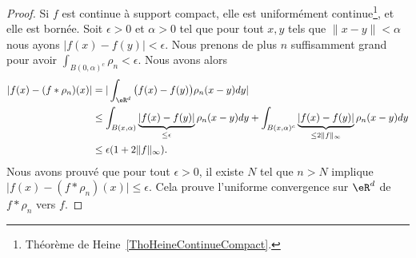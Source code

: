 \begin{proof}
	Si \( f\) est continue à support compact, elle est uniformément continue\footnote{Théorème de Heine~\ref{ThoHeineContinueCompact}.}, et elle est bornée. Soit \( \epsilon>0\) et \( \alpha>0\) tel que pour tout \( x,y\) tels que \( \| x-y \|<\alpha\) nous ayons \( | f(x)-f(y) |<\epsilon\). Nous prenons de plus \(n\) suffisamment grand pour avoir \( \int_{B(0,\alpha)^c}\rho_n<\epsilon\). Nous avons alors
	\begin{subequations}
		\begin{align}
			| f(x)-(f*\rho_n)(x) | & =| \int_{\eR^d}\big( f(x)-f(y) \big)\rho_n(x-y)dy |                                                                                                                 \\
			                       & \leq \int_{B(x,\alpha)}\underbrace{| f(x)-f(y) |}_{\leq \epsilon}\rho_n(x-y)dy+\int_{B(x,\alpha)^c}\underbrace{| f(x)-f(y) |}_{\leq 2\| f \|_{\infty}}\rho_n(x-y)dy \\
			                       & \leq \epsilon(1+2\| f \|_{\infty}).
		\end{align}
	\end{subequations}
	Nous avons prouvé que pour tout \( \epsilon>0\), il existe \( N\) tel que \( n>N\) implique \( \big| f(x)-(f*\rho_n)(x) \big|\leq \epsilon\). Cela prouve l'uniforme convergence sur \( \eR^d\) de \( f*\rho_n\) vers \( f\).


\end{proof}
